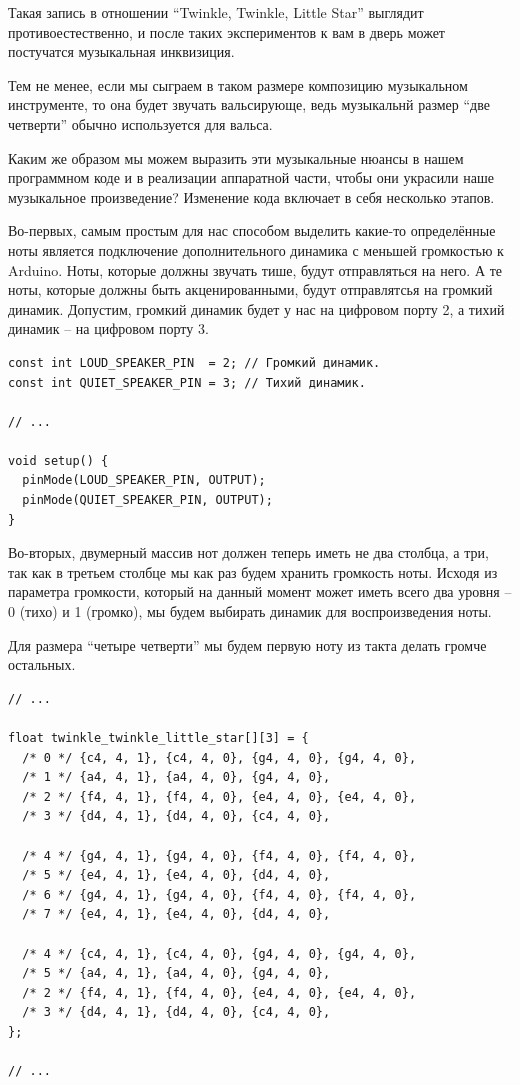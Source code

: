 \documentclass[a4paper,twoside]{book}
\begin{document}
Такая запись в отношении ``Twinkle, Twinkle, Little Star'' выглядит
противоестественно, и после таких экспериментов к вам в дверь может постучатся
музыкальная инквизиция.

Тем не менее, если мы сыграем в таком размере композицию музыкальном
инструменте, то она будет звучать вальсирующе, ведь музыкальнй размер ``две
четверти'' обычно используется для вальса.

Каким же образом мы можем выразить эти музыкальные нюансы в нашем программном
коде и в реализации аппаратной части, чтобы они украсили наше музыкальное
произведение?  Изменение кода включает в себя несколько этапов.

Во-первых, самым простым для нас способом выделить какие-то определённые ноты
является подключение дополнительного динамика с меньшей громкостью к Arduino.
Ноты, которые должны звучать тише, будут отправляться на него.  А те ноты,
которые должны быть акценированными, будут отправлятсья на громкий динамик.
Допустим, громкий динамик будет у нас на цифровом порту 2, а тихий динамик -- на
цифровом порту 3.

\begin{verbatim}
const int LOUD_SPEAKER_PIN  = 2; // Громкий динамик.
const int QUIET_SPEAKER_PIN = 3; // Тихий динамик.

// ...

void setup() {
  pinMode(LOUD_SPEAKER_PIN, OUTPUT);
  pinMode(QUIET_SPEAKER_PIN, OUTPUT);
}
\end{verbatim}

Во-вторых, двумерный массив нот должен теперь иметь не два столбца, а три, так
как в третьем столбце мы как раз будем хранить громкость ноты.  Исходя из
параметра громкости, который на данный момент может иметь всего два уровня -- 0
(тихо) и 1 (громко), мы будем выбирать динамик для воспроизведения ноты.

Для размера ``четыре четверти'' мы будем первую ноту из такта делать громче
остальных.

\begin{verbatim}
// ...

float twinkle_twinkle_little_star[][3] = {
  /* 0 */ {c4, 4, 1}, {c4, 4, 0}, {g4, 4, 0}, {g4, 4, 0},
  /* 1 */ {a4, 4, 1}, {a4, 4, 0}, {g4, 4, 0},
  /* 2 */ {f4, 4, 1}, {f4, 4, 0}, {e4, 4, 0}, {e4, 4, 0},
  /* 3 */ {d4, 4, 1}, {d4, 4, 0}, {c4, 4, 0},

  /* 4 */ {g4, 4, 1}, {g4, 4, 0}, {f4, 4, 0}, {f4, 4, 0},
  /* 5 */ {e4, 4, 1}, {e4, 4, 0}, {d4, 4, 0},
  /* 6 */ {g4, 4, 1}, {g4, 4, 0}, {f4, 4, 0}, {f4, 4, 0},
  /* 7 */ {e4, 4, 1}, {e4, 4, 0}, {d4, 4, 0},

  /* 4 */ {c4, 4, 1}, {c4, 4, 0}, {g4, 4, 0}, {g4, 4, 0},
  /* 5 */ {a4, 4, 1}, {a4, 4, 0}, {g4, 4, 0},
  /* 2 */ {f4, 4, 1}, {f4, 4, 0}, {e4, 4, 0}, {e4, 4, 0},
  /* 3 */ {d4, 4, 1}, {d4, 4, 0}, {c4, 4, 0},
};

// ...
\end{verbatim}
\end{document}

